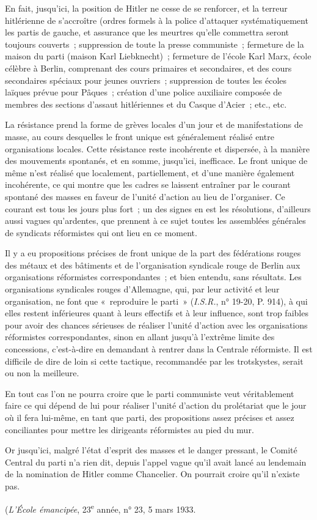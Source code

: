 \documentclass[french,twoside]{book} %
\begin{document}
En fait, jusqu'ici, la position de Hitler ne cesse de se renforcer, et la terreur hitlérienne de s'accroître (ordres formels à la police d'attaquer systéma­tiquement les partis de gauche, et assurance que les meurtres qu'elle commet­tra seront toujours couverts ; suppression de toute la presse communiste ; fermeture de la maison du parti (maison Karl Liebknecht) ; fermeture de l'école Karl Marx, école célèbre à Berlin, comprenant des cours primaires et secondaires, et des cours secondaires spéciaux pour jeunes ouvriers ; suppres­sion de toutes les écoles laïques prévue pour Pâques ; création d'une police auxiliaire composée de membres des sections d'assaut hitlériennes et du Casque d'Acier ; etc., etc.\par
La résistance prend la forme de grèves locales d'un jour et de manifesta­tions de masse, au cours desquelles le front unique est généralement réalisé entre organisations locales. Cette résistance reste incohérente et dispersée, à la manière des mouvements spontanés, et en somme, jusqu'ici, inefficace. Le front unique de même n'est réalisé que localement, partiellement, et d'une manière également incohérente, ce qui montre que les cadres se laissent entraîner par le courant spontané des masses en faveur de l'unité d'action au lieu de l'organiser. Ce courant est tous les jours plus fort ; un des signes en est les résolutions, d'ailleurs aussi vagues qu'ardentes, que prennent à ce sujet toutes les assemblées générales de syndicats réformistes qui ont lieu en ce moment.\par
Il y a eu propositions précises de front unique de la part des fédérations rouges des métaux et des bâtiments et de l'organisation syndicale rouge de Berlin aux organisations réformistes correspondantes ; et bien entendu, sans résultats. Les organisations syndicales rouges d'Allemagne, qui, par leur activité et leur organisation, ne font que « reproduire le parti » ({\itshape I.S.R.}, n° 19-20, P. 914), à qui elles restent inférieures quant à leurs effectifs et à leur influence, sont trop faibles pour avoir des chances sérieuses de réaliser l'unité d'action avec les organisations réformistes correspondantes, sinon en allant jusqu'à l'extrême limite des concessions, c'est-à-dire en demandant à rentrer dans la Centrale réformiste. Il est difficile de dire de loin si cette tactique, recommandée par les trotskystes, serait ou non la meilleure.\par
En tout cas l'on ne pourra croire que le parti communiste veut véritable­ment faire ce qui dépend de lui pour réaliser l'unité d'action du prolétariat que le jour où il fera lui-même, en tant que parti, des propositions assez précises et assez conciliantes pour mettre les dirigeants réformistes au pied du mur.\par
Or jusqu'ici, malgré l'état d'esprit des masses et le danger pressant, le Comité Central du parti n'a rien dit, depuis l'appel vague qu'il avait lancé au lendemain de la nomination de Hitler comme Chancelier. On pourrait croire qu'il n'existe pas.\par
({\itshape L'École émancipée}, 23\textsuperscript{e} année, n° 23, 5 mars 1933.\par
\end{document}
